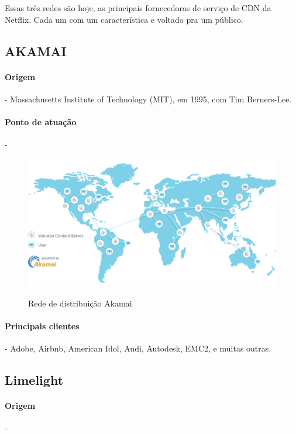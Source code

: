 Essas tr\^es redes s\~ao hoje, as principais fornecedoras de servi\c{c}o de CDN da Netflix. Cada um com um caracter\'istica e voltado pra um p\'ublico.

\subsection{AKAMAI}
\paragraph{Origem}- Massachusetts Institute of Technology (MIT), em 1995, com Tim Berners-Lee.
\paragraph{Ponto de atua\c{c}\~ao}-
\begin{figure}[H]
\caption{Rede de distribui\c{c}\~ao Akamai}
\includegraphics[width=15cm]{Figuras/akamai_map.png} 
\label{figura:akamai_map}
\end{figure}
\paragraph{Principais clientes}- Adobe, Airbnb, American Idol, Audi, Autodesk, EMC2, e muitas outras.
\subsection{Limelight}
\paragraph{Origem}- 
